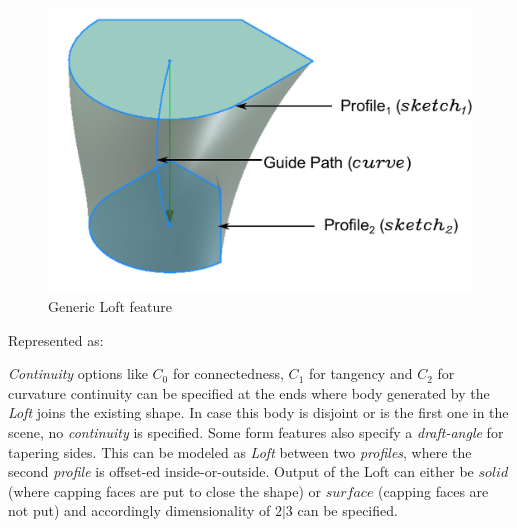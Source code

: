 \begin{figure}[htbp]

	\includegraphics[scale=0.35]{../Common/images//LoftPreview.pdf} 

\caption{Generic Loft feature}
\label{figure_Loft}
\end{figure}

Represented as:

{\em Continuity} options like $C_0$ for connectedness, $C_1$ for tangency and $C_2$ for curvature continuity can be specified at the ends where body generated by the {\em Loft} joins the existing shape. In case this body is disjoint or is the first one in the scene, no {\em continuity}  is specified. Some form features also specify a {\em draft-angle}  for tapering sides. This can be modeled as {\em Loft} between two {\em profiles}, where the second {\em profile} is offset-ed inside-or-outside. Output of the Loft can either be $solid$ (where capping faces are put to close the shape) or $surface$ (capping faces are not put) and accordingly dimensionality of $2|3$ can be specified.


